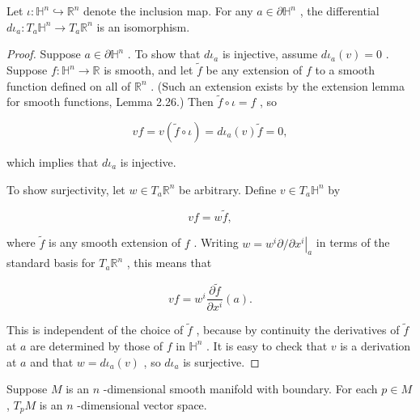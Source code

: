 \begin{lemma}
\label{lem:3-11}
\leanok
{}
Let $\iota  : {\mathbb{H}}^{n} \hookrightarrow  {\mathbb{R}}^{n}$ denote the inclusion map. For any $a \in  \partial {\mathbb{H}}^{n}$ , the differential $d{\iota }_{a} : {T}_{a}{\mathbb{H}}^{n} \rightarrow  {T}_{a}{\mathbb{R}}^{n}$ is an isomorphism.
\end{lemma}

\begin{proof}
\leanok
Suppose $a \in  \partial {\mathbb{H}}^{n}$ . To show that $d{\iota }_{a}$ is injective, assume $d{\iota }_{a}\left( v\right)  = 0$ . Suppose $f : {\mathbb{H}}^{n} \rightarrow  \mathbb{R}$ is smooth, and let $\widetilde{f}$ be any extension of $f$ to a smooth function defined on all of ${\mathbb{R}}^{n}$ . (Such an extension exists by the extension lemma for smooth functions, Lemma 2.26.) Then $\widetilde{f} \circ  \iota  = f$ , so

\[
{vf} = v\left( {\widetilde{f} \circ  \iota }\right)  = d{\iota }_{a}\left( v\right) \widetilde{f} = 0,
\]

which implies that $d{\iota }_{a}$ is injective.

To show surjectivity, let $w \in  {T}_{a}{\mathbb{R}}^{n}$ be arbitrary. Define $v \in  {T}_{a}{\mathbb{H}}^{n}$ by

\[
{vf} = w\widetilde{f},
\]

where $\widetilde{f}$ is any smooth extension of $f$ . Writing $w = {w}^{i}\partial /{\left. \partial {x}^{i}\right| }_{a}$ in terms of the standard basis for ${T}_{a}{\mathbb{R}}^{n}$ , this means that

\[
{vf} = {w}^{i}\frac{\partial \widetilde{f}}{\partial {x}^{i}}\left( a\right) .
\]

This is independent of the choice of $\widetilde{f}$ , because by continuity the derivatives of $\widetilde{f}$ at $a$ are determined by those of $f$ in ${\mathbb{H}}^{n}$ . It is easy to check that $v$ is a derivation at $a$ and that $w = d{\iota }_{a}\left( v\right)$ , so $d{\iota }_{a}$ is surjective.
\end{proof}

\begin{proposition}
\label{prop:3-12}
\leanok
{}
Suppose $M$ is an $n$ -dimensional smooth manifold with boundary. For each $p \in  M$ , ${T}_{p}M$ is an $n$ -dimensional vector space.
\end{proposition}

